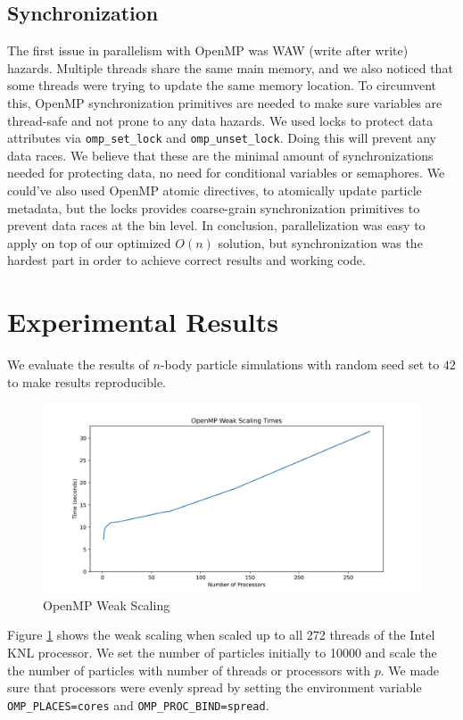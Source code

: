 \documentclass{article}
\begin{document}
\subsection{Synchronization}
The first issue in parallelism with OpenMP was WAW (write after write) hazards. Multiple threads share the same main memory, and we also noticed that some threads were trying to update the same memory location. To circumvent this, OpenMP synchronization primitives are needed to make sure variables are thread-safe and not prone to any data hazards. We used locks to protect data attributes via \verb|omp_set_lock| and \verb|omp_unset_lock|. Doing this will prevent any data races. We believe that these are the minimal amount of synchronizations needed for protecting data, no need for conditional variables or semaphores. We could've also used OpenMP atomic directives, to atomically update particle metadata, but the locks provides coarse-grain synchronization primitives to prevent data races at the bin level. In conclusion, parallelization was easy to apply on top of our optimized $O(n)$ solution, but synchronization was the hardest part in order to achieve correct results and working code.

\section{Experimental Results}
We evaluate the results of $n$-body particle simulations with random seed set to $42$ to make results reproducible.

\begin{figure}[H]
	\centering
	\includegraphics[width=6in]{figures/openmp_weak_scaling_times.png}
	\caption{OpenMP Weak Scaling}
	\label{fig:openmp-weak-scaling}
\end{figure}

Figure \ref{fig:openmp-weak-scaling} shows the weak scaling when scaled up to all 272 threads of the Intel KNL processor. We set the number of particles initially to 10000 and scale the the number of particles with number of threads or processors with $p$. We made sure that processors were evenly spread by setting the environment variable \verb|OMP_PLACES=cores| and \verb|OMP_PROC_BIND=spread|.
\end{document}
